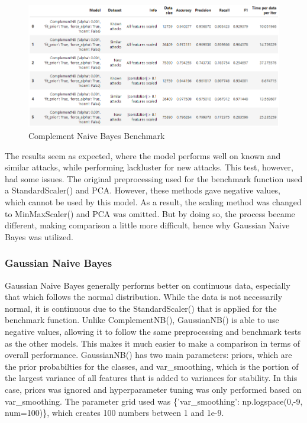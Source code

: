 \begin{figure}[!htb]
    \centering
    \includegraphics[width=\linewidth]{figures//naive_bayes/comp_nb_bench.png}
    \caption{Complement Naive Bayes Benchmark}%
    \label{fig:comp_nb_bench}
\end{figure}


The results seem as expected, where the model performs well on known and similar attacks, while performing lackluster for new attacks. This test, however, had some issues. The original preprocessing used for the benchmark function used a StandardScaler() and PCA. However, these methods gave negative values, which cannot be used by this model. As a result, the scaling method was changed to MinMaxScaler() and PCA was omitted. But by doing so, the process became different, making comparison a little more difficult, hence why Gaussian Naive Bayes was utilized.


\subsubsection{Gaussian Naive Bayes}
Gaussian Naive Bayes generally performs better on continuous data, especially that which follows the normal distribution. While the data is not necessarily normal, it is continuous due to the StandardScaler() that is applied for the benchmark function. Unlike ComplementNB(), GaussianNB() is able to use negative values, allowing it to follow the same preprocessing and benchmark tests as the other models. This makes it much easier to make a comparison in terms of overall performance. GaussianNB() has two main parameters: priors, which are the prior probabilties for the classes, and var\_smoothing, which is the portion of the largest variance of all features that is added to variances for stability. In this case, priors was ignored and hyperparameter tuning was only performed based on var\_smoothing. The parameter grid used was \{'var\_smoothing': np.logspace(0,-9, num=100)\}, which creates 100 numbers between 1 and 1e-9.

